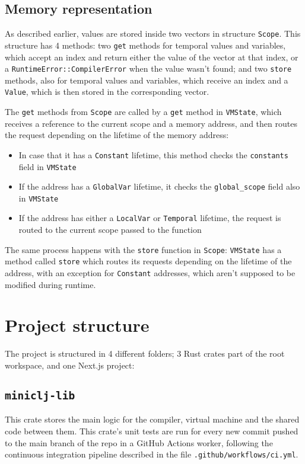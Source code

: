 \documentclass[11pt]{scrreprt}
\begin{document}
\section{Memory representation}
As described earlier, values are stored inside two vectors in structure \texttt{Scope}. This structure has 4 methods: two \texttt{get} methods for temporal values and variables, which accept an index and return either the value of the vector at that index, or a \texttt{RuntimeError::CompilerError} when the value wasn't found; and two \texttt{store} methods, also for temporal values and variables, which receive an index and a \texttt{Value}, which is then stored in the corresponding vector.

The \texttt{get} methods from \texttt{Scope} are called by a \texttt{get} method in \texttt{VMState}, which receives a reference to the current scope and a memory address, and then routes the request depending on the lifetime of the memory address:
\begin{itemize}
  \item In case that it has a \texttt{Constant} lifetime, this method checks the \texttt{constants} field in \texttt{VMState}
  \item If the address has a \texttt{GlobalVar} lifetime, it checks the \texttt{global\_scope} field also in \texttt{VMState}
  \item If the address has either a \texttt{LocalVar} or \texttt{Temporal} lifetime, the request is routed to the current scope passed to the function
\end{itemize}

The same process happens with the \texttt{store} function in \texttt{Scope}: \texttt{VMState} has a method called \texttt{store} which routes its requests depending on the lifetime of the address, with an exception for \texttt{Constant} addresses, which aren't supposed to be modified during runtime.


\chapter{Project structure}
The project is structured in 4 different folders; 3 Rust crates part of the root workspace, and one Next.js project:

\section{\texttt{miniclj-lib}}
This crate stores the main logic for the compiler, virtual machine and the shared code between them. This crate's unit tests are run for every new commit pushed to the main branch of the repo in a GitHub Actions worker, following the continuous integration pipeline described in the file \texttt{.github/workflows/ci.yml}.
\end{document}
